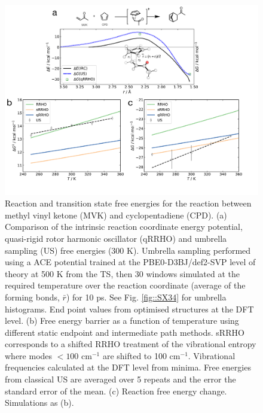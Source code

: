 \documentclass[twoside,twocolumn,9pt]{article}
\begin{document}
\begin{figure}[b]
	\centering
	\includegraphics[width=13.0cm]{figX3}
	\caption{Reaction and transition state free energies for the reaction between methyl vinyl ketone (MVK) and cyclopentadiene (CPD). (a) Comparison of the intrinsic reaction coordinate energy potential, quasi-rigid rotor harmonic oscillator (qRRHO) and umbrella sampling (US) free energies (300 K). Umbrella sampling performed using a ACE potential trained at the PBE0-D3BJ/def2-SVP level of theory at 500 K from the TS, then 30 windows simulated at the required temperature over the reaction coordinate (average of the forming bonds, $\bar{r}$) for 10 ps. See Fig. \ref{fig::SX34} for umbrella histograms. End point values from optimised structures at the DFT level. (b) Free energy barrier as a function of temperature using different static endpoint and intermediate path methods. sRRHO corresponds to a shifted RRHO treatment of the vibrational entropy where modes $<100$ cm$^{-1}$ are shifted to 100 cm$^{-1}$. Vibrational frequencies calculated at the DFT level from minima. Free energies from classical US are averaged over 5 repeats and the error the standard error of the mean. (c) Reaction free energy change. Simulations as (b).}
	\label{fig::X3}
\end{figure}
\end{document}
